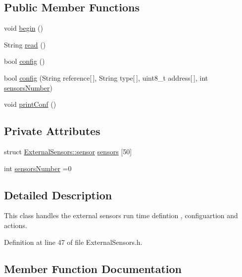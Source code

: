 \subsection*{Public Member Functions}
\begin{DoxyCompactItemize}
\item 
void \hyperlink{class_external_sensors_a58ede0d786a86417254708870f04a21e}{begin} ()
\item 
String \hyperlink{class_external_sensors_a53177b81eca3be89508b5511ddcd00fc}{read} ()
\item 
bool \hyperlink{class_external_sensors_a862a4bd11346b37270d0244c2adabe5a}{config} ()
\item 
bool \hyperlink{class_external_sensors_ac829858f587e15a3fcb00567248f0edd}{config} (String reference\mbox{[}$\,$\mbox{]}, String type\mbox{[}$\,$\mbox{]}, uint8\+\_\+t address\mbox{[}$\,$\mbox{]}, int \hyperlink{class_external_sensors_a58e4fbf9adeae787d92be5fa33043b5d}{sensors\+Number})
\item 
void \hyperlink{class_external_sensors_a78c2bf55084435dd51d3c559b2d3c6f3}{print\+Conf} ()
\end{DoxyCompactItemize}
\subsection*{Private Attributes}
\begin{DoxyCompactItemize}
\item 
struct \hyperlink{struct_external_sensors_1_1sensor}{External\+Sensors\+::sensor} \hyperlink{class_external_sensors_a284233f884fcf00154a44740cf1d9e1e}{sensors} \mbox{[}50\mbox{]}
\item 
int \hyperlink{class_external_sensors_a58e4fbf9adeae787d92be5fa33043b5d}{sensors\+Number} =0
\end{DoxyCompactItemize}


\subsection{Detailed Description}
This class handles the external sensors run time defintion , configuartion and actions. 

Definition at line 47 of file External\+Sensors.\+h.



\subsection{Member Function Documentation}
\mbox{\label{class_external_sensors_a58ede0d786a86417254708870f04a21e}} 
